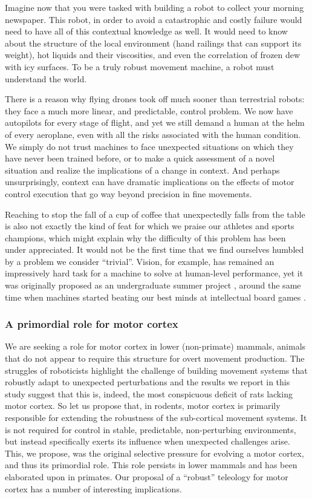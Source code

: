 Imagine now that you were tasked with building a robot to collect your morning newspaper. This robot, in order to avoid a catastrophic and costly failure would need to have all of this contextual knowledge as well. It would need to know about the structure of the local environment (hand railings that can support its weight), hot liquids and their viscosities, and even the correlation of frozen dew with icy surfaces. To be a truly robust movement machine, a robot must understand the world.

There is a reason why flying drones took off much sooner than terrestrial robots: they face a much more linear, and predictable, control problem. We now have autopilots for every stage of flight, and yet we still demand a human at the helm of every aeroplane, even with all the risks associated with the human condition. We simply do not trust machines to face unexpected situations on which they have never been trained before, or to make a quick assessment of a novel situation and realize the implications of a change in context. And perhaps unsurprisingly, context can have dramatic implications on the effects of motor control execution that go way beyond precision in fine movements.

Reaching to stop the fall of a cup of coffee that unexpectedly falls from the table is also not exactly the kind of feat for which we praise our athletes and sports champions, which might explain why the difficulty of this problem has been under appreciated. It would not be the first time that we find ourselves humbled by a problem we consider ``trivial''. Vision, for example, has remained an impressively hard task for a machine to solve at human-level performance, yet it was originally proposed as an undergraduate summer project \cite{Papert1966}, around the same time when machines started beating our best minds at intellectual board games \cite{Samuel1959}.

\subsubsection*{A primordial role for motor cortex}

We are seeking a role for motor cortex in lower (non-primate) mammals, animals that do not appear to require this structure for overt movement production. The struggles of roboticists highlight the challenge of building movement systems that robustly adapt to unexpected perturbations and the results we report in this study suggest that this is, indeed, the most conspicuous deficit of rats lacking motor cortex. So let us propose that, in rodents, motor cortex is primarily responsible for extending the robustness of the sub-cortical movement systems. It is not required for control in stable, predictable, non-perturbing environments, but instead specifically exerts its influence when unexpected challenges arise. This, we propose, was the original selective pressure for evolving a motor cortex, and thus its primordial role. This role persists in lower mammals and has been elaborated upon in primates. Our proposal of a ``robust'' teleology for motor cortex has a number of interesting implications.

